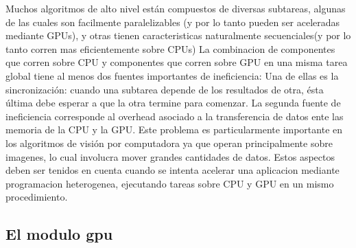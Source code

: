 \documentclass[a4paper,10pt]{report}
\begin{document}
Muchos algoritmos de alto nivel están compuestos de diversas subtareas, algunas de las cuales son facilmente paralelizables (y por lo tanto pueden ser aceleradas mediante GPUs), 
y otras tienen caracteristicas naturalmente secuenciales(y por lo tanto corren mas eficientemente sobre CPUs)
La combinacion de componentes que corren sobre CPU y componentes que corren sobre GPU en una misma tarea global tiene al menos dos fuentes importantes de ineficiencia:
Una de ellas es la sincronización: cuando una subtarea depende de los resultados de otra, ésta última debe esperar a que la otra termine para comenzar.
La segunda fuente de ineficiencia corresponde al overhead asociado a la transferencia de datos ente las memoria de la CPU y la GPU. Este problema es particularmente importante en los algoritmos de visión por computadora ya que
operan principalmente sobre imagenes, lo cual involucra mover grandes cantidades de datos.
Estos aspectos deben ser tenidos en cuenta cuando se intenta acelerar una aplicacion mediante programacion heterogenea, ejecutando tareas sobre CPU y GPU en un mismo procedimiento.














\subsection{El modulo gpu}




% 
% 
% 
% 
% 
\end{document}
